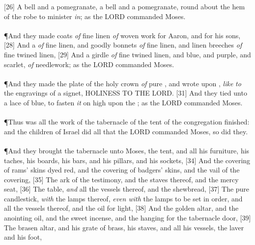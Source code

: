 [26] \textcolor[cmyk]{0.99998,1,0,0}{A bell and a pomegranate, a bell and a pomegranate, round about the hem of the robe to minister \emph{in}; as the LORD commanded Moses.}\\
\\
\P \textcolor[cmyk]{0.99998,1,0,0}{And they made coats \emph{of} fine linen \emph{of} woven work for Aaron, and for his sons,}
[28] \textcolor[cmyk]{0.99998,1,0,0}{And a  \emph{of} fine linen, and goodly bonnets \emph{of} fine linen, and linen breeches \emph{of} fine twined linen,}
[29] \textcolor[cmyk]{0.99998,1,0,0}{And a girdle \emph{of} fine twined linen, and blue, and purple, and scarlet, \emph{of} needlework; as the LORD commanded Moses.}\\
\\
\P \textcolor[cmyk]{0.99998,1,0,0}{And they made the plate of the holy crown \emph{of} pure , and wrote upon  , \emph{like} \emph{to} the engravings of a signet, HOLINESS TO THE LORD.}
[31] \textcolor[cmyk]{0.99998,1,0,0}{And they tied unto  a lace of blue, to fasten \emph{it} on high upon the ; as the LORD commanded Moses.}\\
\\
\P \textcolor[cmyk]{0.99998,1,0,0}{Thus was all the work of the tabernacle of the tent of the congregation finished: and the children of Israel did  all that the LORD commanded Moses, so did they.}\\
\\
\P \textcolor[cmyk]{0.99998,1,0,0}{And they brought the tabernacle unto Moses, the tent, and all his furniture, his taches, his boards, his bars, and his pillars, and his sockets,}
[34] \textcolor[cmyk]{0.99998,1,0,0}{And the covering of rams' skins dyed red, and the covering of badgers' skins, and the vail of the covering,}
[35] \textcolor[cmyk]{0.99998,1,0,0}{The ark of the testimony, and the staves thereof, and the mercy seat,}
[36] \textcolor[cmyk]{0.99998,1,0,0}{The table, \emph{and} all the vessels thereof, and the shewbread,}
[37] \textcolor[cmyk]{0.99998,1,0,0}{The pure candlestick, \emph{with} the lamps thereof, \emph{even with} the lamps to be set in order, and all the vessels thereof, and the oil for light,}
[38] \textcolor[cmyk]{0.99998,1,0,0}{And the golden altar, and the anointing oil, and the sweet incense, and the hanging for the tabernacle door,}
[39] \textcolor[cmyk]{0.99998,1,0,0}{The brasen altar, and his grate of brass, his staves, and all his vessels, the laver and his foot,}
